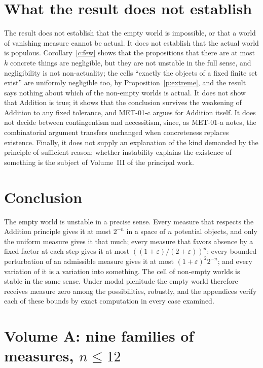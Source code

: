 \documentclass{situationist-preprint}
\begin{document}
\section{What the result does not establish}\label{s:not}

The result does not establish that the empty world is impossible, or that a world of vanishing measure cannot be actual. It does not establish that the actual world is populous. Corollary~\ref{c:few} shows that the propositions that there are at most $k$ concrete things are negligible, but they are not unstable in the full sense, and negligibility is not non-actuality; the cells \enquote{exactly the objects of a fixed finite set exist} are uniformly negligible too, by Proposition~\ref{p:extreme}, and the result says nothing about which of the non-empty worlds is actual. It does not show that Addition is true; it shows that the conclusion survives the weakening of Addition to any fixed tolerance, and MET-01-c argues for Addition itself. It does not decide between contingentism and necessitism, since, as MET-01-a notes, the combinatorial argument transfers unchanged when concreteness replaces existence. Finally, it does not supply an explanation of the kind demanded by the principle of sufficient reason; whether instability explains the existence of something is the subject of Volume~III of the principal work.

\section{Conclusion}

The empty world is unstable in a precise sense. Every measure that respects the Addition principle gives it at most $2^{-n}$ in a space of $n$ potential objects, and only the uniform measure gives it that much; every measure that favors absence by a fixed factor at each step gives it at most $((1+\varepsilon)/(2+\varepsilon))^n$; every bounded perturbation of an admissible measure gives it at most $(1+\varepsilon)^2 2^{-n}$; and every variation of it is a variation into something. The cell of non-empty worlds is stable in the same sense. Under modal plenitude the empty world therefore receives measure zero among the possibilities, robustly, and the appendices verify each of these bounds by exact computation in every case examined.

\appendix

\section{Volume A: nine families of measures, \texorpdfstring{$n \leq 12$}{n <= 12}}\label{app:a}
\end{document}
